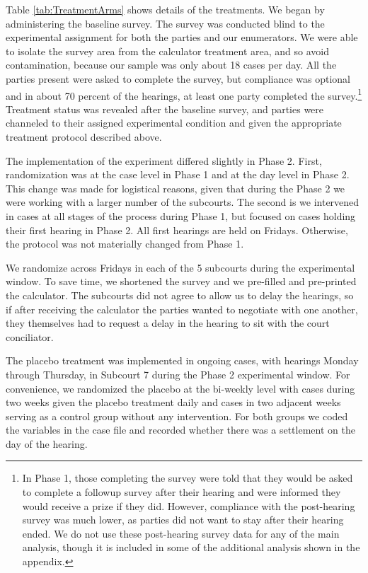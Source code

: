 \documentclass[11pt, a4paper]{article}
\begin{document}
Table \ref{tab:TreatmentArms} shows details of the treatments. We began by administering the baseline survey. The survey was conducted blind to the experimental assignment for both the parties and our enumerators. We were able to isolate the survey area from the calculator  treatment area, and so avoid contamination, because our sample was only about 18 cases per day. All the parties present were asked to complete the survey, but compliance was optional and in about 70 percent of the hearings, at least one party completed the survey.\footnote{In Phase 1, those completing the survey were told that they would be asked to complete a followup survey after their hearing and were informed they would receive a prize if they did. However, compliance with the post-hearing survey was much lower, as parties did not want to stay after their hearing ended. We do not use these post-hearing survey data for any of the main analysis, though it is included in some of the additional analysis shown in the appendix.} Treatment status was revealed after the baseline survey, and parties were channeled to their assigned experimental condition and given the appropriate treatment protocol described above.
  
The implementation of the experiment differed slightly in Phase 2. First, randomization was at the case level in Phase 1 and at the day level in Phase 2. This change was made for logistical reasons, given that during the Phase 2 we were working with a larger number of the subcourts. The second is we intervened in cases at all stages of the process during Phase 1, but focused on cases holding their first hearing in Phase 2. All first hearings are held on Fridays. Otherwise, the protocol was not materially changed from Phase 1.
  
We randomize across Fridays in each of the 5 subcourts during the experimental window.  To save time, we shortened the survey and we pre-filled and pre-printed the calculator. The subcourts did not agree to allow us to delay the hearings, so if after receiving the calculator the parties wanted to negotiate with one another, they themselves had to request a delay in the hearing to sit with the court conciliator. 
  
 The placebo treatment was implemented in ongoing cases, with hearings Monday through Thursday, in Subcourt 7 during the Phase 2 experimental window. For convenience, we randomized the placebo at the bi-weekly level with cases during two weeks given the placebo treatment daily and cases in two adjacent weeks serving as a control group without any intervention. For both groups we coded the variables in the case file and recorded whether there was a settlement on the day of the hearing.
\end{document}
